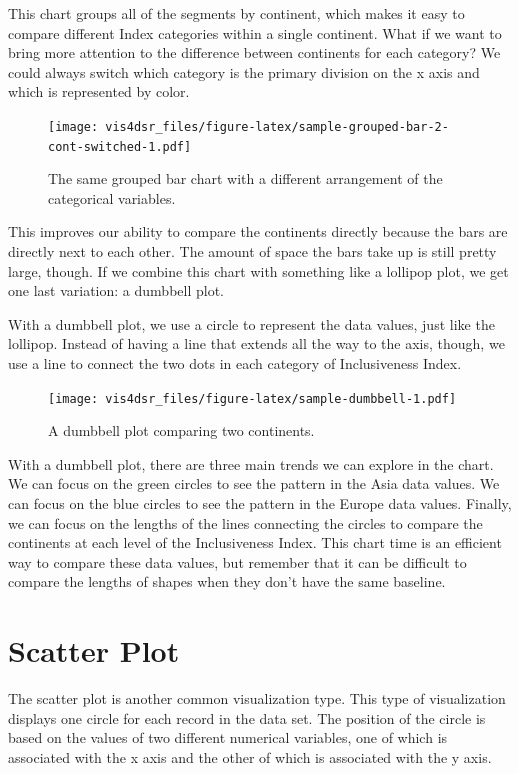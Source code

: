 \documentclass[
]{krantz}
\begin{document}
This chart groups all of the segments by continent, which makes it easy to compare
different Index categories within a single continent. What if we want to bring more
attention to the difference between continents for each category? We could always
switch which category is the primary division on the x axis and which is
represented by color.

\begin{figure}
\centering
\texttt{[image: vis4dsr\_files/figure-latex/sample-grouped-bar-2-cont-switched-1.pdf]}
\caption{\label{fig:sample-grouped-bar-2-cont-switched}The same grouped bar chart with a different arrangement of the categorical variables.}
\end{figure}

This improves our ability to compare the continents directly because the bars are
directly next to each other. The amount of space the bars take up is still pretty
large, though. If we combine this chart with something like a lollipop plot, we
get one last variation: a dumbbell plot.

With a dumbbell plot, we use a circle to represent the data values, just like the
lollipop. Instead of having a line that extends all the way to the axis, though,
we use a line to connect the two dots in each category of Inclusiveness Index.

\begin{figure}
\centering
\texttt{[image: vis4dsr\_files/figure-latex/sample-dumbbell-1.pdf]}
\caption{\label{fig:sample-dumbbell}A dumbbell plot comparing two continents.}
\end{figure}

With a dumbbell plot, there are three main trends we can explore in the chart. We
can focus on the green circles to see the pattern in the Asia data values. We can
focus on the blue circles to see the pattern in the Europe data values. Finally,
we can focus on the lengths of the lines connecting the circles to compare the
continents at each level of the Inclusiveness Index. This chart time is an efficient
way to compare these data values, but remember that it can be difficult to compare
the lengths of shapes when they don't have the same baseline.

\hypertarget{scatter-plot}{%
\section{Scatter Plot}\label{scatter-plot}}

The scatter plot is another common visualization type. This type of visualization
displays one circle for each record in the data set. The position of the circle is
based on the values of two different numerical variables, one of which is associated
with the x axis and the other of which is associated with the y axis.
\end{document}
